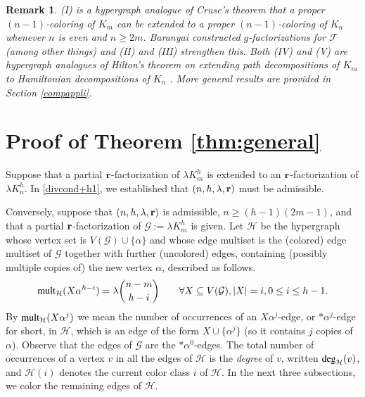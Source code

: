\documentclass[12pt,oneside]{amsart}
\newtheorem{remark}[theorem]{Remark}
\newcommand\mult{\operatorname{\textup{{\fontfamily{ptm}\selectfont mult}}}}
\newcommand\dg{\operatorname{\textup{{\fontfamily{ptm}\selectfont deg}}}}
\newcommand{\cc}{\mathcal}
\begin{document}
\begin{remark}\textup{
(I) is a hypergraph analogue of Cruse's theorem \cite{MR0329925}  that a  proper $(n-1)$-coloring of $K_m$  can be extended to a proper $(n-1)$-coloring of $K_n$ whenever $n$ is even and $n\geq 2m$. Baranyai \cite{MR0416986} constructed $g$-factorizations for $\cc F$ (among other things) and (II) and (III)  strengthen this.
Both (IV) and (V)   are  hypergraph analogues  of Hilton's theorem on extending path decompositions of $K_m$ to Hamiltonian decompositions of $K_n$ \cite{MR746544}. More general results are provided in Section \ref{compappli}. 
}\end{remark}


\section{Proof of Theorem \ref{thm:general}} \label{proof1sec}
Suppose that a partial $\vb r$-factorization of $\lambda K_m^h$ is extended to an $\vb r$-factorization of $\lambda K_n^h$.  In \eqref{divcond+h1}, we established that    $(n,h,\lambda, \vb r)$ must be admissible. 

Conversely, suppose that $(n,h,\lambda, \vb r)$ is admissible, $n \geq (h-1)(2m-1)$, and that a partial $\vb r$-factorization of $\cc G:=\lambda K_m^h$ is given. Let $\cc H$ be the hypergraph whose vertex set is $V(\cc G)\cup \{\alpha\}$ and whose edge multiset is the (colored) edge multiset of $\cc G$ together with further (uncolored) edges, containing (possibly multiple copies of) the new vertex $\alpha$, described as follows.
\begin{align}\label{def2vhyp}
    &&
    \mult_\cc H(X\alpha^{h-i})=\lambda\binom{n-m}{h-i} \qquad \forall X\subseteq V(\cc G), |X|=i, 0\leq i\leq h-1.
    &&
\end{align}
By $\mult_\cc H(X\alpha^j)$ we mean the number of occurrences of an $X\alpha^j$-edge, or $*\alpha^j$-edge for short, in $\cc H$, which is an
edge of the form $X\cup \{\alpha^{j}\}$ (so it contains $j$ copies of $\alpha$). Observe that the edges of $\cc G$ are the $*\alpha^0$-edges. The total number of occurrences of a vertex $v$ in all the edges of $\cc H$ is the {\it degree} of $v$, written  $\dg_\cc H(v)$, and $\cc H(i)$ denotes the current color class $i$ of $\cc H$. 
In the next three subsections, we color the remaining edges of $\cc H$.
\end{document}
